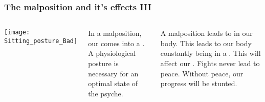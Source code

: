 \begin{frame}
\frametitle{The malposition and it's effects III}
\begin{columns}[c] %


\texttt{[image: Sitting\_posture\_Bad]}

In a malposition, our  comes into a . A physiological posture is necessary for an optimal state of the psyche. 

A malposition leads to  in our body. This leads to our body constantly being in a . This will affect our . Fights never lead to peace. Without peace, our progress will be stunted.
\end{columns}


\end{frame}
